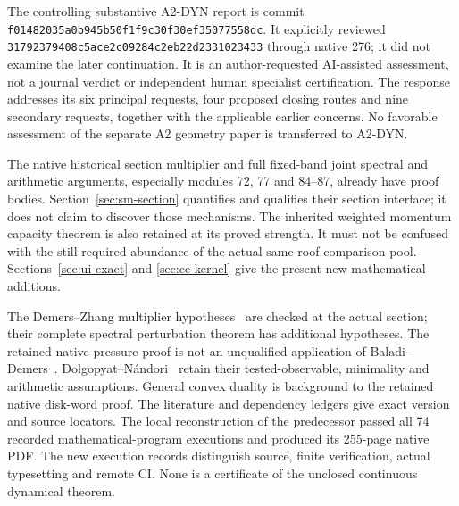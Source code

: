 \documentclass[11pt,reqno]{amsart}
\numberwithin{equation}{section}
\theoremstyle{definition}\newtheorem{definition}[theorem]{Definition}
\theoremstyle{remark}\newtheorem{remark}[theorem]{Remark}
\begin{document}
The controlling substantive A2-DYN report is commit
\texttt{f0148203\allowbreak{}5a0b945b\allowbreak{}50f1f9c3\allowbreak{}0f30ef35\allowbreak{}077558dc}.
It explicitly reviewed
\texttt{31792379\allowbreak{}408c5ace\allowbreak{}2c09284c\allowbreak{}2eb22d23\allowbreak{}31023433}
through native 276; it did not examine the later continuation.
It is an author-requested AI-assisted assessment, not a journal
verdict or independent human specialist certification. The response
addresses its six principal requests, four proposed closing routes
and nine secondary requests, together with the applicable earlier
concerns. No favorable assessment of the separate A2 geometry paper
is transferred to A2-DYN.

The native historical section multiplier and full fixed-band
joint spectral and arithmetic arguments, especially modules
72, 77 and 84--87, already have proof bodies. Section~\ref{sec:sm-section}
quantifies and qualifies their section interface; it does not
claim to discover those mechanisms. The inherited weighted momentum
capacity theorem is also retained at its proved strength. It must
not be confused with the still-required abundance of the actual
same-roof comparison pool. Sections~\ref{sec:ui-exact} and
\ref{sec:ce-kernel} give the present new mathematical additions.

The Demers--Zhang multiplier hypotheses~\cite{DZUniform} are checked
at the actual section; their complete spectral perturbation theorem
has additional hypotheses. The retained native pressure proof is
not an unqualified application of Baladi--Demers~\cite{BDPressure}.
Dolgopyat--N\'andori~\cite{DNFlow} retain their tested-observable,
minimality and arithmetic assumptions. General convex duality
\cite{BVNotes} is background to the retained native disk-word proof.
The literature and dependency ledgers give exact version and source
locators. The local reconstruction of the predecessor passed all
74 recorded mathematical-program executions and produced its
255-page native PDF. The new execution records distinguish source,
finite verification, actual typesetting and remote CI. None is a
certificate of the unclosed continuous dynamical theorem.
\end{document}
